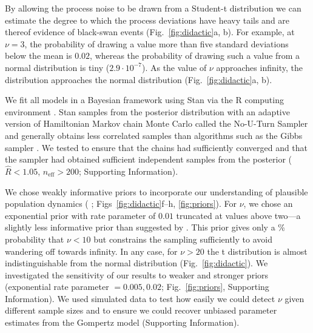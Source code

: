 By allowing the process noise to be drawn from a Student-t distribution we can estimate the degree to which the process deviations have heavy tails and are thereof evidence of black-swan events (Fig.~\ref{fig:didactic}a, b). For example, at $\nu = 3$, the probability of drawing a value more than five standard deviations below the mean is $0.02$, whereas the probability of drawing such a value from a normal distribution is tiny ($2.9\cdot10^{-7}$). As the value of $\nu$ approaches infinity, the distribution approaches the normal distribution (Fig.~\ref{fig:didactic}a, b).

We fit all models in a Bayesian framework using Stan \citep{stan-manual2014} via the R computing environment \citep{r2014}. Stan samples from the posterior distribution with an adaptive version of Hamiltonian Markov chain Monte Carlo called the No-U-Turn Sampler and generally obtains less correlated samples than algorithms such as the Gibbs sampler \citep{hoffman2014}. We tested to ensure that the chains had sufficiently converged and that the sampler had obtained sufficient independent samples from the posterior ($\widehat{R} < 1.05$, $n_\mathrm{eff} > 200$; Supporting Information).

We chose weakly informative priors to incorporate our understanding of plausible population dynamics (\citeauthor{gelman2014} \citeyear{gelman2014}; Figs~\ref{fig:didactic}f--h, \ref{fig:priors}). For $\nu$, we chose an exponential prior with rate parameter of $0.01$ truncated at values above two---a slightly less informative prior than suggested by \citet{fernandez1998}. This prior gives only a \basePriorProbHeavy \% probability that $\nu < 10$ but constrains the sampling sufficiently to avoid wandering off towards infinity. In any case, for $\nu > 20$ the t distribution is almost indistinguishable from the normal distribution (Fig.~\ref{fig:didactic}). We investigated the sensitivity of our results to weaker and stronger priors (exponential rate parameter $= 0.005, 0.02$; Fig.~\ref{fig:priors}, Supporting Information). We used simulated data to test how easily we could detect $\nu$ given different sample sizes and to ensure we could recover unbiased parameter estimates from the Gompertz model (Supporting Information).


